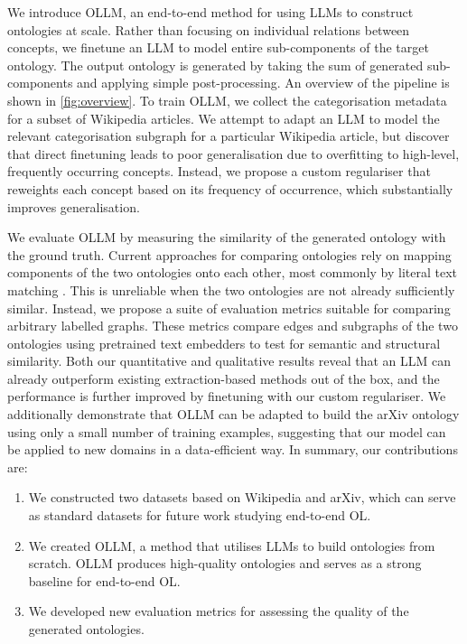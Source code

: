 \documentclass{article}
\newcommand{\name}{{OLLM}\xspace}
\begin{document}
We introduce \name, an end-to-end method for using LLMs to construct ontologies at scale. Rather than focusing on individual relations between concepts, we finetune an LLM to model entire sub-components of the target ontology. The output ontology is generated by taking the sum of generated sub-components and applying simple post-processing. An overview of the pipeline is shown in \cref{fig:overview}. To train \name, we collect the categorisation metadata for a subset of Wikipedia articles. We attempt to adapt an LLM to model the relevant categorisation subgraph for a particular Wikipedia article, but discover that direct finetuning leads to poor generalisation due to overfitting to high-level, frequently occurring concepts. Instead, we propose a custom regulariser that reweights each concept based on its frequency of occurrence, which substantially improves generalisation.

We evaluate \name by measuring the similarity of the generated ontology with the ground truth. Current approaches for comparing ontologies rely on mapping components of the two ontologies onto each other, most commonly by literal text matching \cite{maedche2002measuring,Treeratpituk2013GraphbasedAT}. This is unreliable when the two ontologies are not already sufficiently similar. Instead, we propose a suite of evaluation metrics suitable for comparing arbitrary labelled graphs. These metrics compare edges and subgraphs of the two ontologies using pretrained text embedders to test for semantic and structural similarity. Both our quantitative and qualitative results reveal that an LLM can already outperform existing extraction-based methods out of the box, and the performance is further improved by finetuning with our custom regulariser. We additionally demonstrate that \name can be adapted to build the arXiv ontology using only a small number of training examples, suggesting that our model can be applied to new domains in a data-efficient way. In summary, our contributions are:
\begin{enumerate}[itemsep=0pt,leftmargin=*]
    \item We constructed two datasets based on Wikipedia and arXiv, which can serve as standard datasets for future work studying end-to-end OL.
    \item We created \name, a method that utilises LLMs to build ontologies from scratch. \name produces high-quality ontologies and serves as a strong baseline for end-to-end OL.
    \item We developed new evaluation metrics for assessing the quality of the generated ontologies.
\end{enumerate}
\end{document}
